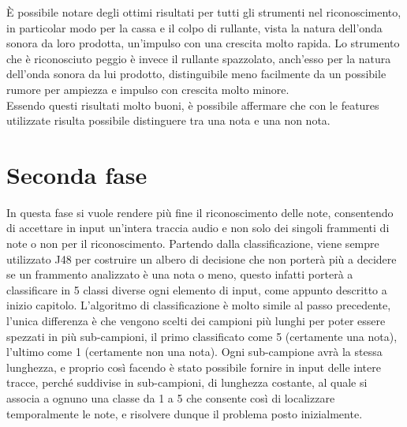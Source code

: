 È possibile notare degli ottimi risultati per tutti gli strumenti nel riconoscimento, in particolar modo per la cassa e il colpo di rullante, vista la natura dell'onda sonora da loro prodotta, un'impulso con una crescita molto rapida. Lo strumento che è riconosciuto peggio è invece il rullante spazzolato, anch'esso per la natura dell'onda sonora da lui prodotto, distinguibile meno facilmente da un possibile rumore per ampiezza e impulso con crescita molto minore.\\
Essendo questi risultati molto buoni, è possibile affermare che con le features utilizzate risulta possibile distinguere tra una nota e una non nota.\\

\section{Seconda fase}
In questa fase si vuole rendere più fine il riconoscimento delle note, consentendo di accettare in input un'intera traccia audio e non solo dei singoli frammenti di note o non per il riconoscimento. Partendo dalla classificazione, viene sempre utilizzato J48 per costruire un albero di decisione che non porterà più a decidere se un frammento analizzato è una nota o meno, questo infatti porterà a classificare in 5 classi diverse ogni elemento di input, come appunto descritto a inizio capitolo. L'algoritmo di classificazione è molto simile al passo precedente, l'unica differenza è che vengono scelti dei campioni più lunghi per poter essere spezzati in più sub-campioni, il primo classificato come 5 (certamente una nota), l'ultimo come 1 (certamente non una nota). Ogni sub-campione avrà la stessa lunghezza, e proprio così facendo è stato possibile fornire in input delle intere tracce, perché suddivise in sub-campioni, di lunghezza costante, al quale si associa a ognuno una classe da 1 a 5 che consente così di localizzare temporalmente le note, e risolvere dunque il problema posto inizialmente. 


